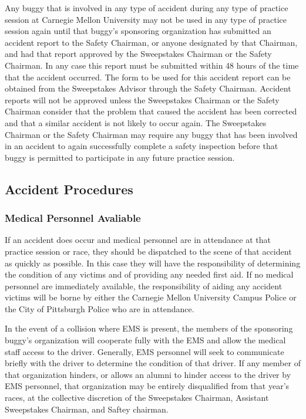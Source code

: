 	Any buggy that is involved in any type of accident during any type of practice session at Carnegie Mellon University may not be used in any type of practice session again until that buggy's sponsoring organization has submitted an accident report to the Safety Chairman, or anyone designated by that Chairman, and had that report approved by the Sweepstakes Chairman or the Safety Chairman. In any case this report must be submitted within 48 hours of the time that the accident occurred. The form to be used for this accident report can be obtained from the Sweepstakes Advisor through the Safety Chairman. Accident reports will not be approved unless the Sweepstakes Chairman or the Safety Chairman consider that the problem that caused the accident has been corrected and that a similar accident is not likely to occur again. The Sweepstakes Chairman or the Safety Chairman may require any buggy that has been involved in an accident to again successfully complete a safety inspection before that buggy is permitted to participate in any future practice session.

\subsection{Accident Procedures}

	\subsubsection{Medical Personnel Avaliable}
	If an accident does occur and medical personnel are in attendance at that practice session or race, they should be dispatched to the scene of that accident as quickly as possible. In this case they will have the responsibility of determining the condition of any victims and of providing any needed first aid. If no medical personnel are immediately available, the responsibility of aiding any accident victims will be borne by either the Carnegie Mellon University Campus Police or the City of Pittsburgh Police who are in attendance.

	In the event of a collision where EMS is present, the members of the sponsoring buggy's organization will cooperate fully with the EMS and allow the medical staff access to the driver. Generally, EMS personnel will seek to communicate briefly with the driver to determine the condition of that driver. If any member of that organization hinders, or allows an alumni to hinder access to the driver by EMS personnel, that organization may be entirely disqualified from that year's races, at the collective discretion of the Sweepstakes Chairman, Assistant Sweepstakes Chairman, and Saftey chairman.

